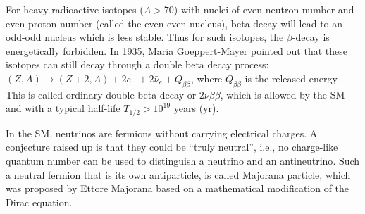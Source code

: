 For heavy radioactive isotopes ($A>70$) with nuclei of even neutron number and even proton number (called the even-even nucleus), beta decay will lead to an odd-odd nucleus which is less stable. Thus for such isotopes, the $\beta$-decay is energetically forbidden. In 1935, Maria Goeppert-Mayer pointed out that these isotopes can still decay through a double beta decay process: $(Z,A) \to (Z+2,A)+2e^{-}+2\bar{\nu}_e+Q_{\beta\beta}$, where $Q_{\beta\beta}$ is the released energy. This is called ordinary double beta decay or $2\nu\beta\beta$, which is allowed by the SM and with a typical half-life $T_{1/2}>10^{19}$ years (yr)\cite{povh2008particles,martin2019nuclear}.

In the SM, neutrinos are fermions without carrying electrical charges. A conjecture raised up is that they could be ``truly neutral'', i.e., no charge-like quantum number can be used to distinguish a neutrino and an antineutrino\cite{akhmedov2014majorana}. Such a neutral fermion 
that is its own antiparticle, is called Majorana particle, which was proposed by Ettore Majorana based on a mathematical modification of the Dirac equation\cite{majorana2006symmetric}.

